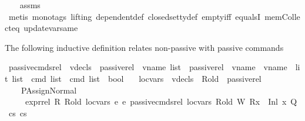 \begin{isabellebody}
%
\isadelimproof
\ \ %
\endisadelimproof
%
\isatagproof
{}\isamarkupfalse%
\ assms\isanewline
\ \ \isamarkupfalse%
\ {\isacharparenleft}{\kern0pt}metis\ {\isacharparenleft}{\kern0pt}mono{\isacharunderscore}{\kern0pt}tags{\isacharcomma}{\kern0pt}\ lifting{\isacharparenright}{\kern0pt}\ dependent{\isacharunderscore}{\kern0pt}def\ closed{\isacharunderscore}{\kern0pt}set{\isacharunderscore}{\kern0pt}ty{\isacharunderscore}{\kern0pt}def\ empty{\isacharunderscore}{\kern0pt}iff\ equals{}I\ mem{\isacharunderscore}{\kern0pt}Collect{\isacharunderscore}{\kern0pt}eq\ update{\isacharunderscore}{\kern0pt}var{\isacharunderscore}{\kern0pt}same{\isacharparenright}{\kern0pt}%
\endisatagproof
{\isafoldproof}%
%
\isadelimproof
%
\endisadelimproof
%
\isadelimdocument
%
\endisadelimdocument
%
\isatagdocument
%
\isamarkuptrue%
%
\endisatagdocument
{\isafolddocument}%
%
\isadelimdocument
%
\endisadelimdocument
%
\begin{isamarkuptext}%
The following inductive definition relates non-passive with passive commands%
\end{isamarkuptext}\isamarkuptrue%
\isamarkupfalse%
\ passive{\isacharunderscore}{\kern0pt}cmds{\isacharunderscore}{\kern0pt}rel\ {\isacharcolon}{\kern0pt}{\isacharcolon}{\kern0pt}\ {\isachardoublequoteopen}vdecls\ {\isasymRightarrow}\ passive{\isacharunderscore}{\kern0pt}rel\ {\isasymRightarrow}\ vname\ list\ {\isasymRightarrow}\ passive{\isacharunderscore}{\kern0pt}rel\ {\isasymRightarrow}\ {\isacharparenleft}{\kern0pt}vname\ {\isasymtimes}\ {\isacharparenleft}{\kern0pt}vname\ {\isacharplus}{\kern0pt}\ lit{\isacharparenright}{\kern0pt}{\isacharparenright}{\kern0pt}\ list\ {\isasymRightarrow}\ cmd\ list\ {\isasymRightarrow}\ cmd\ list\ {\isasymRightarrow}\ bool{\isachardoublequoteclose}\isanewline
\ \ \ loc{\isacharunderscore}{\kern0pt}vars\ {\isacharcolon}{\kern0pt}{\isacharcolon}{\kern0pt}\ vdecls\ \ R{\isacharunderscore}{\kern0pt}old\ {\isacharcolon}{\kern0pt}{\isacharcolon}{\kern0pt}\ passive{\isacharunderscore}{\kern0pt}rel\ \isanewline
\ \ \ \isanewline
\ \ \ \ PAssignNormal{\isacharcolon}{\kern0pt}\ \isanewline
\ \ \ \ {\isachardoublequoteopen}{\isasymlbrakk}\ expr{\isacharunderscore}{\kern0pt}rel\ R\ R{\isacharunderscore}{\kern0pt}old\ loc{\isacharunderscore}{\kern0pt}vars\ e{}\ e{}{\isacharsemicolon}{\kern0pt}\ passive{\isacharunderscore}{\kern0pt}cmds{\isacharunderscore}{\kern0pt}rel\ loc{\isacharunderscore}{\kern0pt}vars\ R{\isacharunderscore}{\kern0pt}old\ W\ {\isacharparenleft}{\kern0pt}R{\isacharparenleft}{\kern0pt}x{}\ {\isasymmapsto}\ {\isacharparenleft}{\kern0pt}Inl\ x{}{\isacharparenright}{\kern0pt}{\isacharparenright}{\kern0pt}{\isacharparenright}{\kern0pt}\ Q\ cs{}\ cs{}\ {\isasymrbrakk}\ {\isasymLongrightarrow}\ \isanewline

\end{isabellebody}
